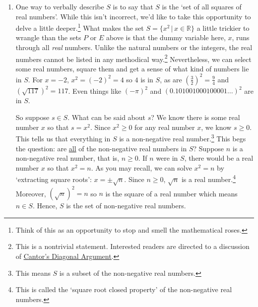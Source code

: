 \documentclass{ximera}
\begin{document}
\begin{example}
\begin{enumerate}
Proceeding in the same way, we generate elements in $E = \{ 2n \, | \, n \in \mathbb Z \}$ by plugging in integer values of $n$ into the formula $2n$.  Starting with $n = 0$ we obtain $2(0) = 0$.  For $n = 1$ we get $2(1) = 2$, for $n = -1$ we get $2(-1) = -2$ for $n = 2$, we get $2(2) = 4$ and for $n = -2$ we get $2(-2) = -4$.  As $n$  moves through the integers, $2n$ produces all of the \textit{even} integers.\footnote{This shouldn't be too surprising, since an even integer is \textit{defined} to be an integer multiple of $2$.} A roster description for  $E$ is $E = \{ 0, \pm 2, \pm 4, \ldots \}$.

\item  One way to verbally describe $S$ is to say that $S$ is the `set of all squares of real numbers'.  While this isn't incorrect, we'd like to take this opportunity to delve a little deeper.\footnote{Think of this as an opportunity to stop and smell the mathematical roses.}  What makes the set $S = \{ x^2 \, | \, x \in \mathbb{R}\}$ a little trickier to wrangle than the sets $P$ or $E$ above is that the dummy variable here, $x$, runs through all \textit{real} numbers.  Unlike the natural numbers or the integers, the real numbers cannot be listed in any methodical way.\footnote{This is a nontrivial statement.  Interested readers are directed to a discussion of \href{http://en.wikipedia.org/wiki/Cantor's_diagonal_argument}{\underline{Cantor's Diagonal Argument}}.}  Nevertheless, we can select some real numbers, square them and get a sense of what kind of numbers lie in $S$.  For $x = -2$, $x^2 = (-2)^2 = 4$ so $4$ is in $S$, as are $\left(\frac{3}{2}\right)^2 = \frac{9}{4}$ and $(\sqrt{117})^2 = 117$.  Even things like $(-\pi)^2$ and $(0.101001000100001 \ldots)^2$ are in $S$.  

So suppose $s \in S$.  What can be said about $s$?  We know there is some real number $x$ so that $s = x^2$.  Since $x^2 \geq 0$ for any real number $x$, we know $s \geq 0$.  This tells us that everything in $S$ is a non-negative real number.\footnote{This means $S$ is a subset of the non-negative real numbers.}  This begs the question:  are \underline{all} of the non-negative real numbers in $S$?  Suppose $n$ is a non-negative real number, that is, $n \geq 0$.  If $n$ were in $S$, there would be a real number $x$ so that $x^2=n$.  As you may recall, we can solve $x^2 = n$ by `extracting square roots':  $x = \pm \sqrt{n}$.  Since $n \geq 0$, $\sqrt{n}$ is a real number.\footnote{This is called the `square root closed property' of the non-negative real numbers.}  Moreover, $(\sqrt{n})^2 = n$ so $n$ is the square of a real number which means $n \in S$. Hence, $S$ is the set of non-negative real numbers.


\end{enumerate}
\end{example}
\end{document}
